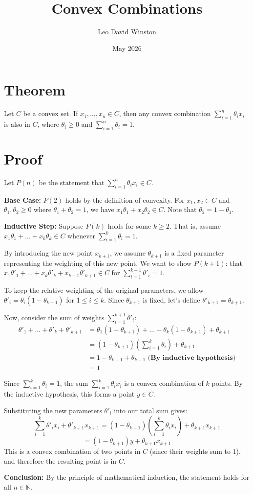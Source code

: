 \documentclass{article}
\title{Convex Combinations}
\author{Leo David Winston}
\date{May 2026}
\begin{document}
\maketitle

\section*{Theorem}
Let $C$ be a convex set. If $x_1, \dots, x_n \in C$, then any convex combination $\sum_{i=1}^{n} \theta_i x_i$ is also in $C$, where $\theta_i \ge 0$ and $\sum_{i=1}^{n} \theta_i = 1$.

\section*{Proof}

Let $P(n)$ be the statement that $\sum_{i=1}^{n} \theta_i x_i \in C$.

\textbf{Base Case:} $P(2)$ holds by the definition of convexity. For $x_1, x_2 \in C$ and $\theta_1, \theta_2 \ge 0$ where $\theta_1 + \theta_2 = 1$, we have $x_1 \theta_1 + x_2 \theta_2 \in C$. Note that $\theta_2 = 1 - \theta_1$.

\textbf{Inductive Step:} Suppose $P(k)$ holds for some $k \ge 2$. That is, assume $x_1 \theta_1 + \dots + x_k \theta_k \in C$ whenever $\sum_{i=1}^k \theta_i = 1$. 

By introducing the new point $x_{k+1}$, we assume $\theta_{k+1}$ is a fixed parameter representing the weighting of this new point. We want to show $P(k+1)$: that $x_1 \theta'_1 + \dots + x_k \theta'_k + x_{k+1} \theta'_{k+1} \in C$ for $\sum_{i=1}^{k+1} \theta'_i = 1$.

To keep the relative weighting of the original parameters, we allow $\theta'_i = \theta_i(1-\theta_{k+1})$ for $1 \le i \le k$. Since $\theta_{k+1}$ is fixed, let's define $\theta'_{k+1} = \theta_{k+1}$.

Now, consider the sum of weights $\sum_{i=1}^{k+1} \theta'_i$:
\begin{align*}
\theta'_1 + \dots + \theta'_k + \theta'_{k+1} &= \theta_1(1-\theta_{k+1}) + \dots + \theta_k(1-\theta_{k+1}) + \theta_{k+1} \\
&= (1-\theta_{k+1})\left(\sum_{i=1}^{k}\theta_i\right) + \theta_{k+1} \quad  \\ 
&= 1-\theta_{k+1} + \theta_{k+1} \textbf{  (By inductive hypothesis)}\\ 
&= 1 
\end{align*}

Since $\sum_{i=1}^k \theta_i = 1$, the sum $\sum_{i=1}^k \theta_i x_i$ is a convex combination of $k$ points. By the inductive hypothesis, this forms a point $y \in C$. 

Substituting the new parameters $\theta'_i$ into our total sum gives:
\[ \sum_{i=1}^{k} \theta'_i x_i + \theta'_{k+1}x_{k+1} = (1-\theta_{k+1})\left(\sum_{i=1}^k \theta_i x_i\right) + \theta_{k+1}x_{k+1} \]
\[ = (1-\theta_{k+1})y + \theta_{k+1}x_{k+1} \]
This is a convex combination of two points in $C$ (since their weights sum to $1$), and therefore the resulting point is in $C$.

\textbf{Conclusion:} By the principle of mathematical induction, the statement holds for all $n \in \mathbb{N}$.
\end{document}
